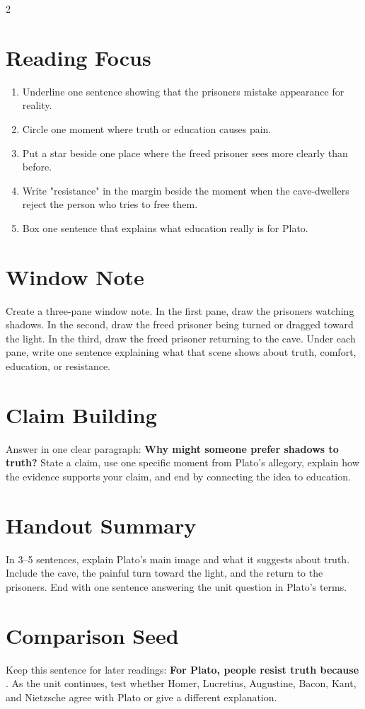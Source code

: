 \documentclass[12pt]{article}
\begin{document}
\begin{multicols}{2}
\section*{Reading Focus}
\begin{enumerate}[leftmargin=*, itemsep=0.2em]
\item Underline one sentence showing that the prisoners mistake appearance for reality.
\item Circle one moment where truth or education causes pain.
\item Put a star beside one place where the freed prisoner sees more clearly than before.
\item Write "resistance" in the margin beside the moment when the cave-dwellers reject the person who tries to free them.
\item Box one sentence that explains what education really is for Plato.
\end{enumerate}

\section*{Window Note}
Create a three-pane window note. In the first pane, draw the prisoners watching shadows. In the second, draw the freed prisoner being turned or dragged toward the light. In the third, draw the freed prisoner returning to the cave. Under each pane, write one sentence explaining what that scene shows about truth, comfort, education, or resistance.

\section*{Claim Building}
Answer in one clear paragraph: \textbf{Why might someone prefer shadows to truth?} State a claim, use one specific moment from Plato's allegory, explain how the evidence supports your claim, and end by connecting the idea to education.

\section*{Handout Summary}
In 3--5 sentences, explain Plato's main image and what it suggests about truth. Include the cave, the painful turn toward the light, and the return to the prisoners. End with one sentence answering the unit question in Plato's terms.

\section*{Comparison Seed}
Keep this sentence for later readings: \textbf{For Plato, people resist truth because} \underline{\hspace{1.8in}}. As the unit continues, test whether Homer, Lucretius, Augustine, Bacon, Kant, and Nietzsche agree with Plato or give a different explanation.

\end{multicols}
\end{document}
